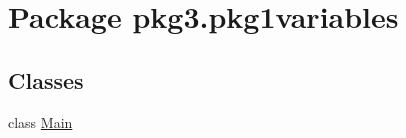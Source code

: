 \hypertarget{namespacepkg3_1_1pkg1variables}{}\section{Package pkg3.\+pkg1variables}
\label{namespacepkg3_1_1pkg1variables}
\subsection*{Classes}
\begin{DoxyCompactItemize}
\item 
class \mbox{\hyperlink{classpkg3_1_1pkg1variables_1_1_main}{Main}}
\end{DoxyCompactItemize}
